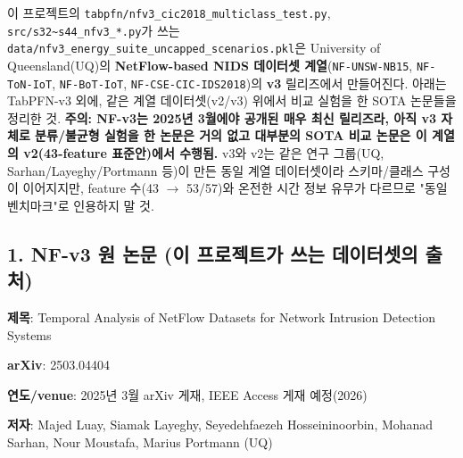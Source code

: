 이 프로젝트의 \texttt{tabpfn/\allowbreak{}\allowbreak{}n\allowbreak{}fv3\_\allowbreak{}\allowbreak{}cic2\allowbreak{}018\_\allowbreak{}\allowbreak{}mult\allowbreak{}iclass\_\allowbreak{}\allowbreak{}t\allowbreak{}est.\allowbreak{}py}, \texttt{src/\allowbreak{}\allowbreak{}s32\textasciitilde{}\allowbreak{}s44\_\allowbreak{}\allowbreak{}nfv3\allowbreak{}\_\allowbreak{}\allowbreak{}*.\allowbreak{}py}가 쓰는 \texttt{data/\allowbreak{}\allowbreak{}nfv\allowbreak{}3\_\allowbreak{}\allowbreak{}energy\allowbreak{}\_\allowbreak{}\allowbreak{}suite\_\allowbreak{}\allowbreak{}u\allowbreak{}ncapped\_\allowbreak{}\allowbreak{}scenario\allowbreak{}s.\allowbreak{}pkl}은 University of Queensland(UQ)의 \textbf{NetFlow-based NIDS 데이터셋 계열}(\texttt{NF-\allowbreak{}UNSW-\allowbreak{}NB15}, \texttt{NF-\allowbreak{}ToN-\allowbreak{}I\allowbreak{}oT}, \texttt{NF-\allowbreak{}BoT-\allowbreak{}I\allowbreak{}oT}, \texttt{NF-\allowbreak{}CSE-\allowbreak{}C\allowbreak{}IC-\allowbreak{}IDS20\allowbreak{}18})의 \textbf{v3} 릴리즈에서 만들어진다. 아래는 TabPFN-v3 외에, 같은 계열 데이터셋(v2/\allowbreak{}v3) 위에서 비교 실험을 한 SOTA 논문들을 정리한 것. \textbf{주의: NF-v3는 2025년 3월에야 공개된 매우 최신 릴리즈라, 아직 v3 자체로 분류/\allowbreak{}불균형 실험을 한 논문은 거의 없고 대부분의 SOTA 비교 논문은 이 계열의 v2(43-feature 표준안)에서 수행됨.} v3와 v2는 같은 연구 그룹(UQ, Sarhan/\allowbreak{}Layeghy/\allowbreak{}Portmann 등)이 만든 동일 계열 데이터셋이라 스키마/\allowbreak{}클래스 구성이 이어지지만, feature 수(43  \ensuremath{\rightarrow}  53/\allowbreak{}57)와 온전한 시간 정보 유무가 다르므로 "동일 벤치마크"로 인용하지 말 것.

\subsection{1. NF-v3 원 논문 (이 프로젝트가 쓰는 데이터셋의 출처)}
\par\noindent \textbullet\enspace \textbf{제목}: Temporal Analysis of NetFlow Datasets for Network Intrusion Detection Systems


\par\noindent \textbullet\enspace \textbf{arXiv}: 2503.04404


\par\noindent \textbullet\enspace \textbf{연도/\allowbreak{}venue}: 2025년 3월 arXiv 게재, IEEE Access 게재 예정(2026)


\par\noindent \textbullet\enspace \textbf{저자}: Majed Luay, Siamak Layeghy, Seyedehfaezeh Hosseininoorbin, Mohanad Sarhan, Nour Moustafa, Marius Portmann (UQ)


